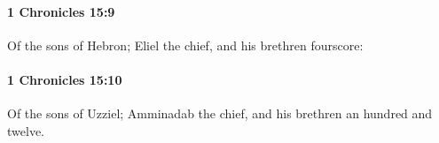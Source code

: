 		\paragraph{1 Chronicles 15:9} %
			\label{1CHRONICLES-15-9}

			Of the sons of Hebron; Eliel the chief, and his brethren fourscore:


		\paragraph{1 Chronicles 15:10} %
			\label{1CHRONICLES-15-10}

			Of the sons of Uzziel; Amminadab the chief, and his brethren an hundred and twelve.


